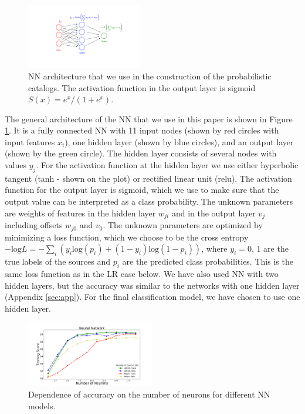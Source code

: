 \begin{figure}[h]
\centering
\hspace*{-0.5cm}
\includegraphics[width=0.45\textwidth]{plots/CNN_network.pdf}
\caption{
NN architecture that we use in the construction of the probabilistic catalogs.
The activation function in the output layer is sigmoid $S(x) = {e^{x}}/{(1 + e^{x})}$.
}
\label{fig:NN_structure}
\end{figure}

The general architecture of the NN that we use in this paper is shown in Figure \ref{fig:NN_structure}.
It is a fully connected NN with 11 input nodes (shown by red circles with input features $x_i$), one hidden layer (shown by blue circles),
and an output layer (shown by the green circle).
The hidden layer consists of several nodes with values $y_j$. 
For the activation function at the hidden layer we use either hyperbolic tangent (tanh - shown on the plot) or rectified linear unit (relu).
The activation function for the output layer is sigmoid, which we use to make sure that the output value can be interpreted as a class probability.
The unknown parameters are weights of features in the hidden layer $w_{ji}$ and in the output layer $v_j$ including
offsets $w_{j0}$ and $v_0$.
The unknown parameters are optimized by minimizing a loss function, which we choose to be
the cross entropy
$-\text{log}L = - \sum_i (y_i\text{log}(p_i)+(1-y_i)\text{log}(1 - p_i))$, 
where $y_i = 0,\,1$ are the true labels of the sources and $p_i$ are the predicted class probabilities.
This is the same loss function as in the LR case below.
We have also used NN with two hidden layers, but the accuracy was similar to the networks with one hidden layer (Appendix \ref{sec:app}). For the final classification model, we have chosen to use one hidden layer.

\begin{figure}[h]

\hspace*{-0.5cm}
\includegraphics[width=0.5\textwidth]{plots/nn_train_neurons_assocnewfeat.pdf}
\caption{Dependence of accuracy on the number of neurons for different NN models.}
\label{fig:NN_neurons}
\end{figure}

